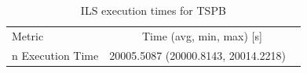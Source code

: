\begin{table}[h!]
\centering
\begin{tabular}{lc}
\hline
Metric & Time (avg, min, max) [s] \\n\hline
Execution Time & 20005.5087 (20000.8143, 20014.2218) \
\hline
\end{tabular}
\caption{ILS execution times for TSPB}
\label{tab:TSPB_ils_timings}
\end{table}
